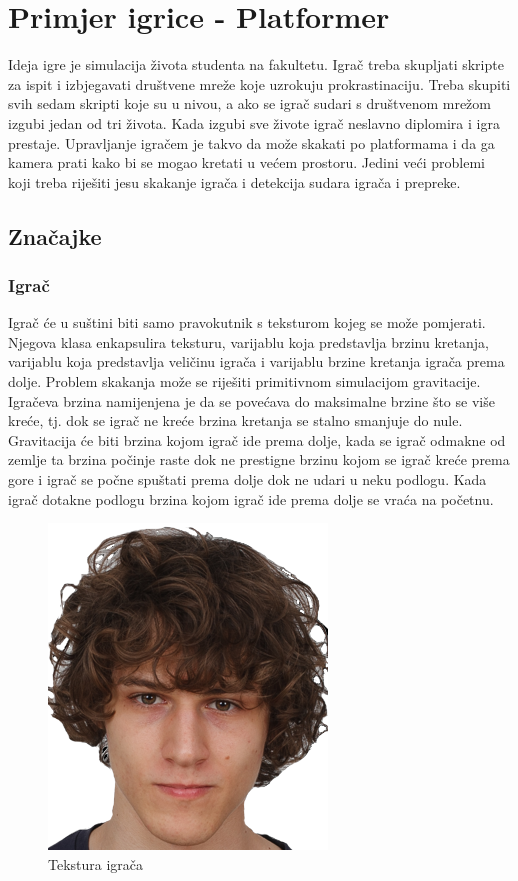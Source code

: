 \documentclass{mathos}
\begin{document}
\chapter{Primjer igrice - Platformer}
Ideja igre je simulacija života studenta na fakultetu. Igrač treba skupljati skripte za ispit i izbjegavati društvene mreže koje uzrokuju prokrastinaciju. Treba skupiti svih sedam
skripti koje su u nivou, a ako se igrač sudari s društvenom mrežom izgubi jedan od tri života. Kada izgubi sve živote igrač neslavno diplomira i igra prestaje.
Upravljanje igračem je takvo da može skakati po platformama i da ga kamera prati kako bi se mogao kretati u većem prostoru. Jedini veći problemi koji treba riješiti jesu skakanje
igrača i detekcija sudara igrača i prepreke.
\section{Značajke}
\subsection{Igrač}
Igrač će u suštini biti samo pravokutnik s teksturom kojeg se može pomjerati. Njegova klasa enkapsulira teksturu, varijablu koja predstavlja brzinu kretanja, varijablu
koja predstavlja veličinu igrača i varijablu brzine kretanja igrača prema dolje. Problem skakanja može se riješiti primitivnom simulacijom gravitacije. Igračeva brzina namijenjena
je da se povećava do maksimalne brzine što se više kreće, tj. dok se igrač ne kreće brzina kretanja se stalno smanjuje do nule. Gravitacija će biti brzina kojom igrač ide prema
dolje, kada se igrač odmakne od zemlje ta brzina počinje raste dok ne prestigne brzinu kojom se igrač kreće prema gore i igrač se počne spuštati prema dolje dok ne udari u neku
podlogu. Kada igrač dotakne podlogu brzina kojom igrač ide prema dolje se vraća na početnu.

\begin{figure}[H]
    \centering
    \includegraphics[scale=0.2]{Slike/unknown.png}
    \caption{Tekstura igrača}
    \label{im_igrac}
\end{figure}
\end{document}
